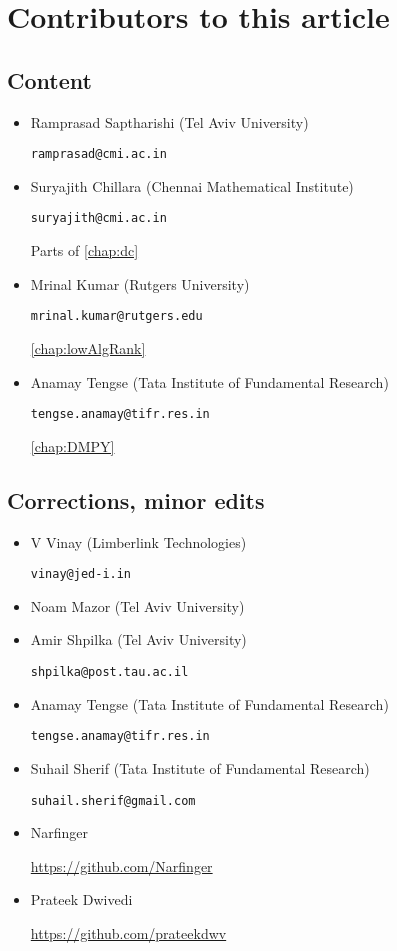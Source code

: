 \chapter*{Contributors to this article}

\section*{Content}

\begin{itemize}
\item Ramprasad Saptharishi (Tel Aviv University)

\texttt{ramprasad@cmi.ac.in}

\item Suryajith Chillara (Chennai Mathematical Institute)

\texttt{suryajith@cmi.ac.in}

Parts of \autoref{chap:dc}

  
\item Mrinal Kumar (Rutgers University)

\texttt{mrinal.kumar@rutgers.edu}

\autoref{chap:lowAlgRank}

\item Anamay Tengse (Tata Institute of Fundamental Research)

\texttt{tengse.anamay@tifr.res.in}

\autoref{chap:DMPY}

\end{itemize}

\section*{Corrections, minor edits}

\begin{itemize}
\item V Vinay (Limberlink Technologies)

\texttt{vinay@jed-i.in}

\item Noam Mazor (Tel Aviv University)

\item Amir Shpilka (Tel Aviv University)

\texttt{shpilka@post.tau.ac.il}

\item Anamay Tengse (Tata Institute of Fundamental Research)

\texttt{tengse.anamay@tifr.res.in}

\item Suhail Sherif (Tata Institute of Fundamental Research)

\texttt{suhail.sherif@gmail.com}

\item Narfinger

  \url{https://github.com/Narfinger}

\item Prateek Dwivedi

  \url{https://github.com/prateekdwv}
  
\end{itemize}


